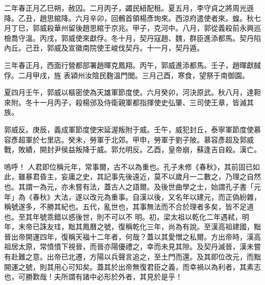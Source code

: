 \begin{pinyinscope}
 二年春正月乙巳朔，赦囚。二月丙子，蠲民紐配租。夏五月，李守貞之將周光遜降。乙丑，趙思綰降。六月辛卯，回鶻首領楊彥珣來。西涼府遣使者來。蝗。秋七月丁巳，郭威殺華州留後趙思綰于京兆。甲子，克河中。八月，郭從義殺前永興巡檢喬守溫。丙戌，郭威使來獻俘。冬十月，契丹寇趙、魏，群臣進添都馬。契丹陷內丘。己丑，郭威及宣徽南院使王峻伐契丹。十一月，契丹遁。



 三年春正月，西面行營都部署趙暉克鳳翔。丙午，郭威進添都馬。壬子，趙暉獻馘俘。二月甲戌，旌
 表潁州汝陰民麴溫門閭。三月己酉，寒食，望祭于南御園。



 夏四月壬午，郭威以樞密使為天雄軍節度使。六月癸卯，河決原武。秋八月，達靼來附。冬十一月丙子，殺楊邠及侍衛親軍都指揮使史弘肇、三司使王章，皆滅其族。



 郭威反。庚辰，義成軍節度使宋延渥叛附于威。壬午，威犯封丘，泰寧軍節度使慕容彥超軍於七里店。癸未，勞軍于北郊。甲申，勞軍于劉子陂。慕容彥超及郭威戰，敗績，開封尹侯益叛降于威。郭允明反。乙酉，皇帝崩，蘇逢吉自殺。漢亡。



 嗚呼！
 人君即位稱元年，常事爾，古不以為重也。孔子未修《春秋》，其前固已如此，雖暴君昏主，妄庸之史，其記事先後遠近，莫不以歲月一二數之，乃理之自然也。其謂一為元，亦未嘗有法，蓋古人之語爾。及後世曲學之士，始謂孔子書「元年」為《春秋》大法，遂以改元為重事。自漢以後，又名年以建元，而正偽紛雜，稱號遂多，不勝其紀也。五代，亂世也，其事無法而不合於理者多矣，皆不足道也。至其年號乖錯以惑後世，則不可以不
 明。初，梁太祖以乾化二年遇弒，明年，末帝已誅友珪，黜其鳳曆之號，復稱乾化三年，尚為有說。至漢高祖建國，黜晉出帝開運四年，復稱天福十二年者，何哉？蓋以其愛憎之私爾。方出帝時，漢高祖居太原，常憤憤下視晉，而晉亦陽優禮之，幸而未見其隙。及契丹滅晉，漢未嘗有赴難之意。出帝已北遷，方陽以兵聲言追之，至土門而還。及其即位改元，而黜開運之號，則其用心可知矣。蓋其於出帝無復君臣之義，而幸禍以為利者，其素志也，可勝歎哉！夫所謂有諸中必形於外者，其見於是乎！



\end{pinyinscope}